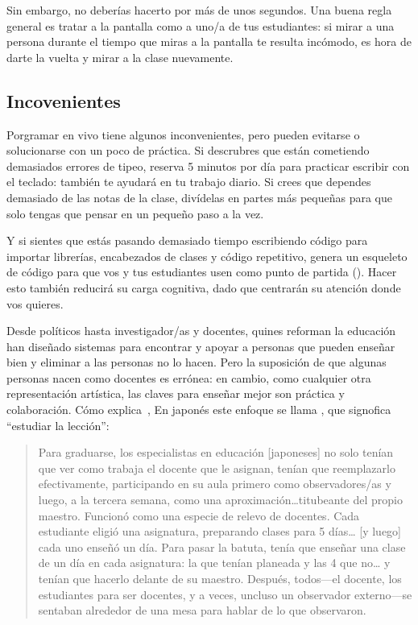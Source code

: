 Sin embargo, no deberías hacerto por más de unos segundos.
Una buena regla general es tratar a la pantalla como a uno/a de tus estudiantes:
si mirar a una persona durante el tiempo que miras a la pantalla te resulta incómodo, es hora de darte la vuelta y mirar a la clase nuevamente.

\subsection*{Incovenientes}

Porgramar en vivo tiene algunos inconvenientes,
pero pueden evitarse o solucionarse con un poco de práctica.
Si descrubres que están cometiendo demasiados errores de tipeo,
reserva 5 minutos por día para practicar escribir con el teclado:
también te ayudará en tu trabajo diario.
Si crees que dependes demasiado de las notas de la clase,
divídelas en partes más pequeñas 
para que solo tengas que pensar en un pequeño paso a la vez.

Y si sientes que estás pasando demasiado tiempo escribiendo código para importar librerías, encabezados de clases y código repetitivo, 
genera un esqueleto de código para que vos y tus estudiantes usen como punto de partida ().
Hacer esto también reducirá su carga cognitiva,
dado que centrarán su atención donde vos quieres.


Desde políticos hasta investigador/as y docentes,
quines reforman la educación han diseñado sistemas 
para encontrar y apoyar a personas que pueden enseñar bien
y eliminar a las personas no lo hacen.
Pero la suposición de que algunas personas nacen como docentes es errónea:
en cambio,
como cualquier otra representación artística,
las claves para enseñar mejor son práctica y colaboración.
Cómo explica~\cite{Gree2014},
En japonés este enfoque se llama ,
que signofica ``estudiar la lección'':

\begin{quote}

  Para graduarse,
  los especialistas en educación [japoneses] no solo tenían que ver como trabaja el docente que le asignan,
  tenían que reemplazarlo efectivamente,
  participando en su aula primero como observadores/as y luego,
  a la tercera semana,
  como una aproximación{\ldots}titubeante del propio maestro.
  Funcionó como una especie de relevo de docentes.
  Cada estudiante eligió una asignatura,
  preparando clases para 5 días{\ldots} [y luego] cada uno enseñó un día.
  Para pasar la batuta,
  tenía que enseñar una clase de un día en cada asignatura:
  la que tenían planeada y las 4 que no{\ldots}
  y tenían que hacerlo delante de su maestro.
  Después, todos---el docente, los estudiantes para ser docentes,
  y a veces, uncluso un observador externo---se sentaban alrededor de una mesa
  para hablar de lo que observaron.

\end{quote}

